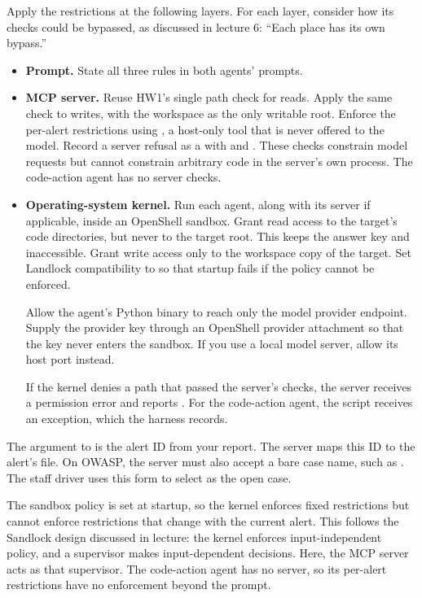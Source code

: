 \documentclass[9pt,letterpaper]{article}
\begin{document}
Apply the restrictions at the following layers. For each layer, consider how its
checks could be bypassed, as discussed in lecture 6: ``Each place has its own
bypass.''
\begin{itemize}
\item \textbf{Prompt.} State all three rules in both agents' prompts.
\item \textbf{MCP server.} Reuse HW1's single path check for reads. Apply the same
  check to writes, with the workspace as the only writable root. Enforce the
  per-alert restrictions using , a host-only tool that
  is never offered to the model. Record a server refusal as a 
  with  and . These checks constrain
  model requests but cannot constrain arbitrary code in the server's own
  process. The code-action agent has no server checks.
\item \textbf{Operating-system kernel.} Run each agent, along with its server if
  applicable, inside an OpenShell sandbox. Grant read access to the target's code
  directories, but never to the target root. This keeps the answer key and
   inaccessible. Grant write access only to the workspace copy of the
  target. Set Landlock compatibility to  so that startup
  fails if the policy cannot be enforced.

  Allow the agent's Python binary to reach only the model provider endpoint.
  Supply the provider key through an OpenShell provider attachment so that the
  key never enters the sandbox. If you use a local model server, allow its host
  port instead.

  If the kernel denies a path that passed the server's checks, the server
  receives a permission error and reports . For the
  code-action agent, the script receives an exception, which the harness records.
\end{itemize}

The argument to  is the alert ID from your report. The server maps
this ID to the alert's file. On OWASP, the server must also accept a bare case
name, such as . The staff driver uses
this form to select  as the open case.

The sandbox policy is set at startup, so the kernel enforces fixed restrictions
but cannot enforce restrictions that change with the current alert. This follows
the Sandlock design discussed in lecture: the kernel enforces input-independent
policy, and a supervisor makes input-dependent decisions. Here, the MCP server
acts as that supervisor. The code-action agent has no server, so its per-alert
restrictions have no enforcement beyond the prompt.
\end{document}
